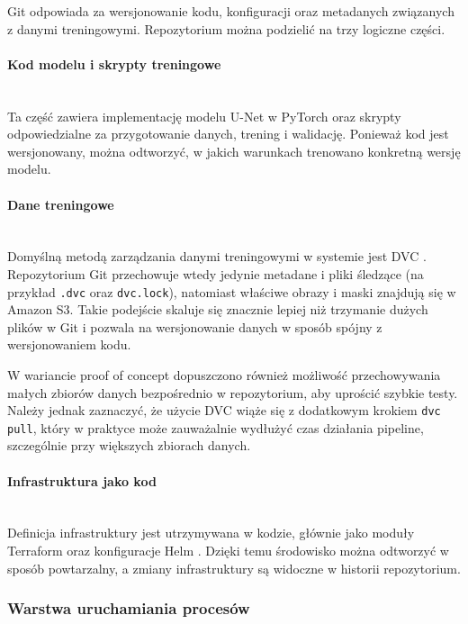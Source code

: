 Git odpowiada za wersjonowanie kodu, konfiguracji oraz metadanych związanych z danymi treningowymi. Repozytorium można podzielić na trzy logiczne części.

\paragraph{Kod modelu i skrypty treningowe}\mbox{}\\
Ta część zawiera implementację modelu U-Net w PyTorch oraz skrypty odpowiedzialne za przygotowanie danych, trening i walidację. Ponieważ kod jest wersjonowany, można odtworzyć, w jakich warunkach trenowano konkretną wersję modelu.

\paragraph{Dane treningowe}\mbox{}\\
Domyślną metodą zarządzania danymi treningowymi w systemie jest DVC \cite{dvc_docs}. Repozytorium Git przechowuje wtedy jedynie metadane i pliki śledzące (na przykład \texttt{.dvc} oraz \texttt{dvc.lock}), natomiast właściwe obrazy i maski znajdują się w Amazon S3. Takie podejście skaluje się znacznie lepiej niż trzymanie dużych plików w Git i pozwala na wersjonowanie danych w sposób spójny z wersjonowaniem kodu.

W wariancie proof of concept dopuszczono również możliwość przechowywania małych zbiorów danych bezpośrednio w repozytorium, aby uprościć szybkie testy. Należy jednak zaznaczyć, że użycie DVC wiąże się z dodatkowym krokiem \texttt{dvc pull}, który w praktyce może zauważalnie wydłużyć czas działania pipeline, szczególnie przy większych zbiorach danych.

\paragraph{Infrastruktura jako kod}\mbox{}\\
Definicja infrastruktury jest utrzymywana w kodzie, głównie jako moduły Terraform \cite{hashicorp_terraform} oraz konfiguracje Helm \cite{helm_docs}. Dzięki temu środowisko można odtworzyć w sposób powtarzalny, a zmiany infrastruktury są widoczne w historii repozytorium.

\subsubsection{Warstwa uruchamiania procesów}

